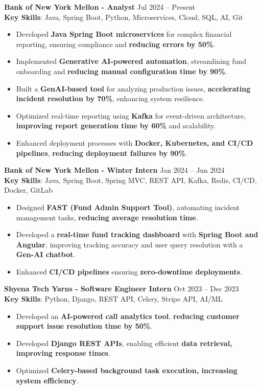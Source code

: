 \documentclass[a4paper,10pt]{article}
\begin{document}
\textbf{Bank of New York Mellon - Analyst} \hfill Jul 2024 -- Present\\
\textbf{Key Skills}: Java, Spring Boot, Python, Microservices, Cloud, SQL, AI, Git
\begin{itemize}
    \item Developed \textbf{Java Spring Boot microservices} for complex financial reporting, ensuring compliance and \textbf{reducing errors by 50\%}.
    \item Implemented \textbf{Generative AI-powered automation}, streamlining fund onboarding and \textbf{reducing manual configuration time by 90\%}.
    \item Built a \textbf{GenAI-based tool} for analyzing production issues, \textbf{accelerating incident resolution by 70\%}, enhancing system resilience.
    \item Optimized real-time reporting using \textbf{Kafka} for event-driven architecture, \textbf{improving report generation time by 60\%} and scalability.
    \item Enhanced deployment processes with \textbf{Docker, Kubernetes, and CI/CD pipelines}, \textbf{reducing deployment failures by 90\%}.
\end{itemize}
\vspace{3 pt}
\textbf{Bank of New York Mellon - Winter Intern} \hfill Jan 2024 -- Jun 2024\\
\textbf{Key Skills}: Java, Spring Boot, Spring MVC, REST API, Kafka, Redis, CI/CD, Docker, GitLab
\begin{itemize}
    \item Designed \textbf{FAST (Fund Admin Support Tool)}, automating incident management tasks, \textbf{reducing average resolution time}.
    \item Developed a \textbf{real-time fund tracking dashboard} with \textbf{Spring Boot and Angular}, improving tracking accuracy and user query resolution with a \textbf{Gen-AI chatbot}.
    \item Enhanced \textbf{CI/CD pipelines} ensuring \textbf{zero-downtime deployments}.
\end{itemize}
\vspace{3 pt}
\textbf{Shyena Tech Yarns - Software Engineer Intern} \hfill Oct 2023 -- Dec 2023\\
\textbf{Key Skills}: Python, Django, REST API, Celery, Stripe API, AI/ML
\begin{itemize}
    \item Developed an \textbf{AI-powered call analytics tool}, \textbf{reducing customer support issue resolution time by 50\%}.
    \item Developed \textbf{Django REST APIs}, enabling efficient \textbf{data retrieval, improving response times}.
    \item Optimized \textbf{Celery-based background task execution, increasing system efficiency}.
\end{itemize}
\vspace{3 pt}
\end{document}
